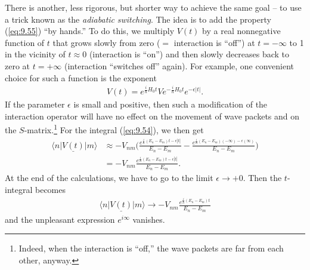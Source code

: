 \documentclass[]{stefan1}
\begin{document}
There is another, less rigorous, but shorter way to achieve the same
goal -- to use a trick known as the \emph{adiabatic} \emph{switching}.
 The idea is to add the property
(\ref{eq:9.55}) ``by hands.'' To do this, we multiply $ V (t) $ by a
real nonnegative function of $ t $ that grows slowly from zero ($=$
interaction is ``off'') at $ t = - \infty $ to 1 in the vicinity of
$ t \approx 0 $ (interaction is ``on'') and then slowly decreases back
to zero at $ t = +\infty $ (interaction ``switches off'' again). For
example, one convenient choice for such a function is the exponent
%
\begin{align}
V(t) = e^{\frac{i}{\hbar }H_{0}t} V e^{-\frac{i}{\hbar }H_{0}t}e^{-
\epsilon |t|}. \label{eq:adiaba}
\end{align}
If the parameter $ \epsilon $ is small and positive, then such a
modification of the interaction operator will have no effect on the
movement of wave packets and on the $ S $-matrix.\footnote{Indeed,
when the interaction is ``off,'' the wave packets are far from each
other, anyway.} For the integral (\ref{eq:9.54}), we then get
%
\begin{align*}
\langle n \vert \underline{V(t)} \vert m \rangle &
\approx - V_{nm} \biggl( \frac{
e^{\frac{i}{\hbar }(E_{n}-E_{m})t - \epsilon |t|}}{E
_{n}-E_{m}} - \frac{
e^{\frac{i}{\hbar }(E_{n}-E_{m})(-\infty ) -
\epsilon (\infty )}}{ E_{n}-E_{m}}
\biggr)
\\
&= - V_{nm} \frac{
e^{\frac{i}{\hbar }(E_{n}-E_{m})t - \epsilon |t|}}{E
_{n}-E_{m}}.
\end{align*}
At the end of the calculations, we have to go to the limit $ \epsilon
\to + 0 $. Then the $ t $-integral becomes
%
\begin{align}
\langle n \vert \underline{V(t)} \vert m \rangle
\longrightarrow - V_{nm} \frac{ e^{\frac{i}{\hbar }(E_{n}-E_{m})t }}{E_{n}-E_{m}} \label{eq:9.56}
\end{align}
and the unpleasant expression $e^{i \infty }$ vanishes.
\end{document}
